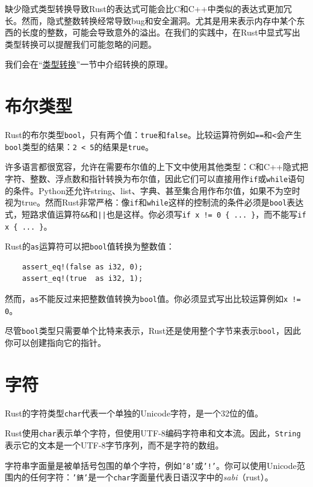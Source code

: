 缺少隐式类型转换导致Rust的表达式可能会比C和C++中类似的表达式更加冗长。然而，隐式整数转换经常导致bug和安全漏洞。尤其是用来表示内存中某个东西的长度的整数，可能会导致意外的溢出。在我们的实践中，在Rust中显式写出类型转换可以提醒我们可能忽略的问题。

我们会在“\hyperref[cast]{类型转换}”一节中介绍转换的原理。

\section{布尔类型}

Rust的布尔类型\texttt{bool}，只有两个值：\texttt{true}和\texttt{false}。比较运算符例如\texttt{==}和\texttt{<}会产生\texttt{bool}类型的结果：\texttt{2 < 5}的结果是\texttt{true}。

许多语言都很宽容，允许在需要布尔值的上下文中使用其他类型：C和C++隐式把字符、整数、浮点数和指针转换为布尔值，因此它们可以直接用作\texttt{if}或\texttt{while}语句的条件。Python还允许string、list、字典、甚至集合用作布尔值，如果不为空时视为true。然而Rust非常严格：像\texttt{if}和\texttt{while}这样的控制流的条件必须是\texttt{bool}表达式，短路求值运算符\texttt{\&\&}和\texttt{||}也是这样。你必须写\texttt{if x != 0 \{ ... \}}，而不能写\texttt{if x \{ ... \}}。

Rust的\texttt{as}运算符可以把\texttt{bool}值转换为整数值：
\begin{verbatim}
    assert_eq!(false as i32, 0);
    assert_eq!(true  as i32, 1);
\end{verbatim}

然而，\texttt{as}不能反过来把整数值转换为\texttt{bool}值。你必须显式写出比较运算例如\texttt{x != 0}。

尽管\texttt{bool}类型只需要单个比特来表示，Rust还是使用整个字节来表示\texttt{bool}，因此你可以创建指向它的指针。

\section{字符}\label{char}
Rust的字符类型\texttt{char}代表一个单独的Unicode字符，是一个32位的值。

Rust使用\texttt{char}表示单个字符，但使用UTF-8编码字符串和文本流。因此，\texttt{String}表示它的文本是一个UTF-8字节序列，而不是字符的数组。

字符串字面量是被单括号包围的单个字符，例如\texttt{'8'}或\texttt{'!'}。你可以使用Unicode范围内的任何字符：\texttt{'錆'}是一个\texttt{char}字面量代表日语汉字中的\emph{sabi}（rust）。

